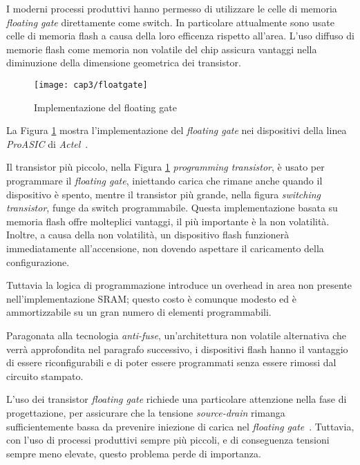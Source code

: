 I moderni processi produttivi hanno permesso di utilizzare le celle di memoria \textit{floating gate} direttamente come switch. In particolare attualmente sono usate celle di memoria flash a causa della loro efficenza rispetto all'area. L'uso diffuso di memorie flash come memoria non volatile del chip assicura vantaggi nella diminuzione della dimensione geometrica dei transistor.

\begin{figure}[H]  
  \begin{center}
    \texttt{[image: cap3/floatgate]}
    \caption{Implementazione del floating gate}
    \label{floatgate}
  \end{center}
\end{figure}

La Figura \ref{floatgate} mostra l'implementazione del \textit{floating gate} nei dispositivi della linea \textit{ProASIC} di \textit{Actel}~\cite{actelpro}. 

Il transistor più piccolo, nella Figura \ref{floatgate} \textit{programming transistor}, è usato per programmare il \textit{floating gate}, iniettando carica che rimane anche quando il dispositivo è spento, mentre il transistor più grande, nella figura \textit{switching transistor}, funge da switch programmabile. Questa implementazione basata su memoria flash offre molteplici vantaggi, il più importante è la non volatilità. Inoltre, a causa della non volatilità, un dispositivo flash funzionerà immediatamente all'accensione, non dovendo aspettare il caricamento della configurazione.

Tuttavia la logica di programmazione introduce un overhead in area non presente nell'implementazione SRAM; questo costo è comunque modesto ed è ammortizzabile su un gran numero di elementi programmabili.

Paragonata alla tecnologia \textit{anti-fuse}, un'architettura non volatile alternativa che verrà approfondita nel paragrafo successivo, i dispositivi flash hanno il vantaggio di essere riconfigurabili e di poter essere programmati senza essere rimossi dal circuito stampato.

L'uso dei transistor \textit{floating gate} richiede una particolare attenzione nella fase di progettazione, per assicurare che la tensione \textit{source-drain} rimanga sufficientemente bassa da prevenire iniezione di carica nel \textit{floating gate}~\cite{510550}. Tuttavia, con l'uso di processi produttivi sempre più piccoli, e di conseguenza tensioni sempre meno elevate, questo problema perde di importanza.

